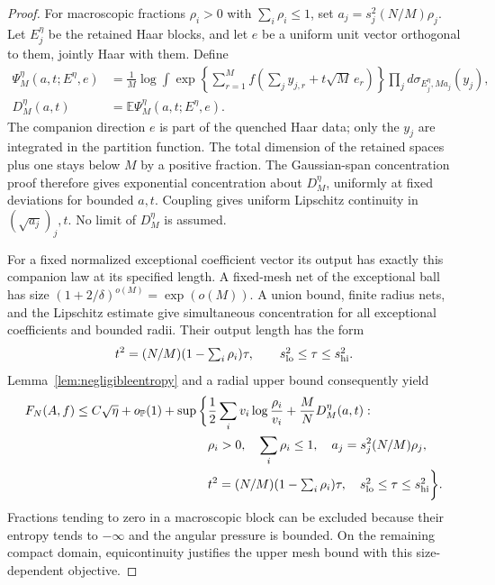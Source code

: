 \documentclass[11pt]{article}
\numberwithin{equation}{section}
\theoremstyle{definition}
\newcommand{\E}{\mathbb E}
\newcommand{\Pbb}{\mathbb P}
\begin{document}
\begin{proof}
For macroscopic fractions $\rho_i>0$ with $\sum_i\rho_i\le1$, set $a_j=s_j^2(N/M)\rho_j$. Let $E_j^\eta$ be the retained Haar blocks, and let $e$ be a uniform unit vector orthogonal to them, jointly Haar with them. Define
\begin{align*}
\Psi_M^\eta(a,t;E^\eta,e)
&=\frac1M\log\int
\exp\left\{\sum_{r=1}^M
f\left(\sum_jy_{j,r}+t\sqrt M\,e_r\right)\right\}
\prod_jd\sigma_{E_j^\eta,Ma_j}(y_j),\\
D_M^\eta(a,t)&=\E\Psi_M^\eta(a,t;E^\eta,e).
\end{align*}
The companion direction $e$ is part of the quenched Haar data; only the $y_j$ are integrated in the partition function. The total dimension of the retained spaces plus one stays below $M$ by a positive fraction. The Gaussian-span concentration proof therefore gives exponential concentration about $D_M^\eta$, uniformly at fixed deviations for bounded $a,t$. Coupling gives uniform Lipschitz continuity in $(\sqrt{a_j})_j,t$. No limit of $D_M^\eta$ is assumed.

For a fixed normalized exceptional coefficient vector its output has exactly this companion law at its specified length. A fixed-mesh net of the exceptional ball has size $(1+2/\delta)^{o(M)}=\exp(o(M))$. A union bound, finite radius nets, and the Lipschitz estimate give simultaneous concentration for all exceptional coefficients and bounded radii. Their output length has the form
\[
t^2=(N/M)(1-\textstyle\sum_i\rho_i)\tau,
\qquad s_{\rm lo}^2\le\tau\le s_{\rm hi}^2.
\]
Lemma~\ref{lem:negligibleentropy} and a radial upper bound consequently yield
\begin{align}\label{eq:edgeupper}
F_N(A,f)\le C\sqrt\eta+o_{\Pbb}(1)+
\sup\bigg\{&\frac12\sum_i v_i\log\frac{\rho_i}{v_i}
+\frac MN D_M^\eta(a,t):\notag\\
&\rho_i>0,\quad\sum_i\rho_i\le1,\quad
 a_j=s_j^2(N/M)\rho_j,\notag\\
&t^2=(N/M)(1-\textstyle\sum_i\rho_i)\tau,\quad
s_{\rm lo}^2\le\tau\le s_{\rm hi}^2\bigg\}.
\end{align}
Fractions tending to zero in a macroscopic block can be excluded because their entropy tends to $-\infty$ and the angular pressure is bounded. On the remaining compact domain, equicontinuity justifies the upper mesh bound with this size-dependent objective.


\end{proof}
\end{document}
